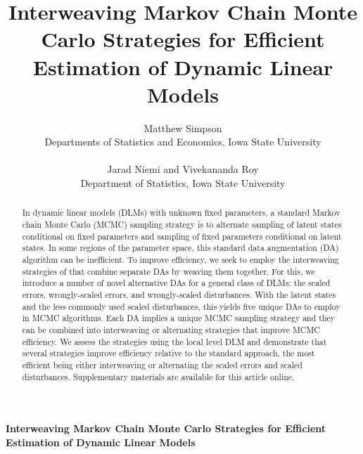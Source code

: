 \documentclass[12pt]{article}
\begin{document}
\def\spacingset#1{\renewcommand{\baselinestretch}%
{#1}\small\normalsize} \spacingset{1}
\setlength{\tabcolsep}{2pt}

\blind
{
  \title{\bf Interweaving Markov Chain Monte Carlo Strategies for Efficient
    Estimation of Dynamic Linear Models}
  \author{Matthew Simpson\\
    Departments of Statistics and Economics, Iowa State University\\~\\
    Jarad Niemi and Vivekananda Roy\\
    Department of Statistics, Iowa State University}
  \maketitle
} \fi

\blind
{
  \bigskip
  \bigskip
  \bigskip
  \begin{center}
    {\LARGE\bf Interweaving Markov Chain Monte Carlo Strategies for Efficient
    Estimation of Dynamic Linear Models}
\end{center}
  \medskip
} \fi

\bigskip


\begin{abstract}
In dynamic linear models (DLMs) with unknown fixed parameters, a standard Markov chain Monte Carlo (MCMC) sampling strategy is to alternate sampling of latent states conditional on fixed parameters and sampling of fixed parameters conditional on latent states. In some regions of the parameter space, this standard data augmentation (DA) algorithm can be inefficient. To improve efficiency, we seek to employ the interweaving strategies of \citet{yu2011center} that combine separate DAs by weaving them together. For this, we introduce a number of novel alternative DAs for a general class of DLMs: the scaled errors, wrongly-scaled errors, and wrongly-scaled disturbances. With the latent states and the less commonly used scaled disturbances, this yields five unique DAs to employ in MCMC algorithms. Each DA implies a unique MCMC sampling strategy and they can be combined into interweaving or alternating strategies that improve MCMC efficiency. We assess the strategies using the local level DLM and demonstrate that several strategies improve efficiency relative to the standard approach, the most efficient being either interweaving or alternating the scaled errors and scaled disturbances. Supplementary materials are available for this article online.
\end{abstract}
\end{document}
